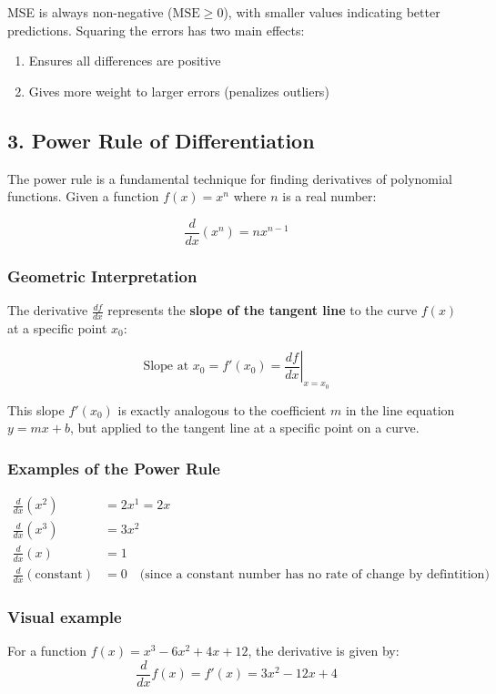 \documentclass{article}
\begin{document}
MSE is always non-negative ($\text{MSE} \geq 0$), with smaller values indicating better predictions. Squaring the errors has two main effects:
\begin{enumerate}
    \item Ensures all differences are positive
    \item Gives more weight to larger errors (penalizes outliers)
\end{enumerate}

\subsection*{3. Power Rule of Differentiation}
The power rule is a fundamental technique for finding derivatives of polynomial functions. Given a function $f(x) = x^n$ where $n$ is a real number:

\[
\frac{d}{dx}(x^n) = n x^{n-1}
\]

\subsubsection*{Geometric Interpretation}
The derivative $\frac{df}{dx}$ represents the \textbf{slope of the tangent line} to the curve $f(x)$ at a specific point $x_0$:

\[
\text{Slope at } x_0 = f'(x_0) = \left. \frac{df}{dx} \right|_{x=x_0}
\]

This slope $f'(x_0)$ is exactly analogous to the coefficient $m$ in the line equation $y = mx + b$, but applied to the tangent line at a specific point on a curve.

\subsubsection*{Examples of the Power Rule}
\begin{align*}
    \frac{d}{dx}(x^2) &= 2x^{1} = 2x \\
    \frac{d}{dx}(x^3) &= 3x^{2} \\
    \frac{d}{dx}(x) &= 1\\
    \frac{d}{dx}(\text{constant}) &= 0 \quad \text{(since a constant number has no rate of change by defintition)}
\end{align*}

\subsubsection*{Visual example}
For a function $f(x) = x^3 - 6x^2 + 4x + 12$, the derivative is given by:
\[
\frac{d}{dx}f(x) = f'(x)= 3x^2 - 12x + 4 
\]
\end{document}
